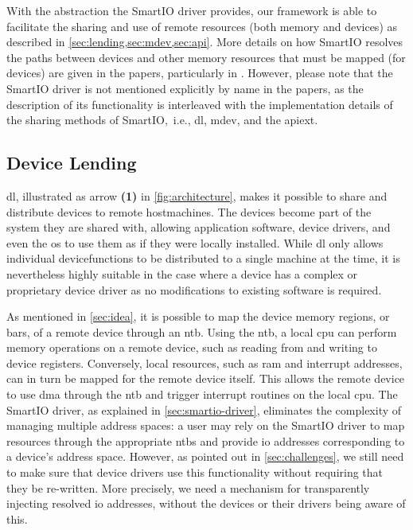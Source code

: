 With the abstraction the SmartIO driver provides, our framework is able to facilitate the sharing and use of remote resources (both memory and devices) as described in \cref{sec:lending,sec:mdev,sec:api}.
%
More details on how SmartIO resolves the paths between devices and other memory resources that must be mapped (for devices) are given in the papers, particularly in .
%
However, please note that the SmartIO driver is not mentioned explicitly by name in the papers, as the description of its functionality is interleaved with the implementation details of the sharing methods of SmartIO,~i.e., \gls{dl}, \gls{mdev}, and the \gls{apiext}.



\subsection{Device Lending}\label{sec:lending}
\Gls{dl}, illustrated as arrow \textbf{(1)} in \cref{fig:architecture}, makes it possible to share and distribute devices to remote \glspl{hostmachine}.
%
The devices become part of the system they are shared with, allowing application software, device drivers, and even the \gls{os} to use them as if they were locally installed.
%
While \gls{dl} only allows individual \glspl{devicefunction} to be distributed to a single machine at the time, it is nevertheless highly suitable in the case where a device has a complex or proprietary device driver as no modifications to existing software is required.


As mentioned in \cref{sec:idea}, it is possible to map the device memory regions, or \glspl{bar}, of a remote device through an \gls{ntb}.
%
Using the \gls{ntb}, a local \gls{cpu} can perform memory operations on a remote device, such as reading from and writing to device registers.
%
Conversely, local resources, such as \gls{ram} and interrupt addresses, can in turn be mapped for the remote device itself. 
%
This allows the remote device to use \gls{dma} through the \gls{ntb} and trigger interrupt routines on the local \gls{cpu}.
%
The SmartIO driver, as explained in \cref{sec:smartio-driver}, eliminates the complexity of managing multiple address spaces: a user may rely on the SmartIO driver to map resources through the appropriate \glspl{ntb} and provide \gls{io} addresses corresponding to a device's address space.
%
However, as pointed out in \cref{sec:challenges}, we still need to make sure that device drivers use this functionality without requiring that they be re-written. 
%
More precisely, we need a mechanism for transparently injecting resolved \gls{io} addresses, without the devices or their drivers being aware of this.



